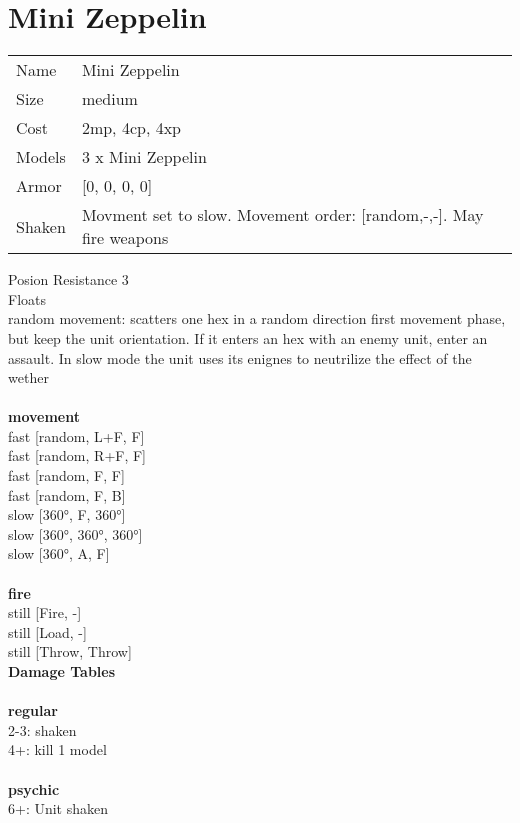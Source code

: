 \clearpage

\section{ Mini Zeppelin }

\begin{tabular}{ll}
  Name & Mini Zeppelin \\
  Size & medium\\
  Cost & 2mp, 4cp, 4xp\\
  Models & 3 x Mini Zeppelin\\
  Armor & [0, 0, 0, 0]\\
  Shaken & Movment set to slow. Movement order: [random,-,-]. May fire weapons\\
\end{tabular}

\noindent Posion Resistance 3\\ 
Floats\\ 
random movement: scatters one hex in a random direction first movement phase, but keep the unit orientation. If it enters an hex with an enemy unit, enter an assault. In slow mode the unit uses its enignes to neutrilize the effect of the wether\\ 


\ \\ {\bf movement } \\
fast [random, L+F, F] \\
fast [random, R+F, F] \\
fast [random, F, F] \\
fast [random, F, B] \\
slow [360°, F, 360°] \\
slow [360°, 360°, 360°] \\
slow [360°, A, F] \\
\ \\ {\bf fire } \\
still [Fire, -] \\
still [Load, -] \\
still [Throw, Throw] \\


{\bf Damage Tables} \\
\ \\ {\bf regular } \\
2-3: shaken \\
4+: kill 1 model \\
\ \\ {\bf psychic } \\
6+: Unit shaken \\


